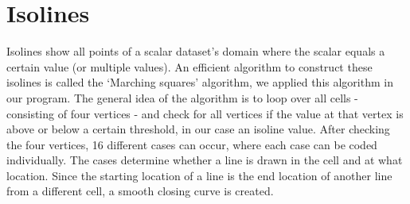 \section{Isolines}
Isolines show all points of a scalar dataset's domain where the scalar equals a certain value (or multiple values).
An efficient algorithm to construct these isolines is called the `Marching squares' algorithm, we applied this algorithm in our program.
The general idea of the algorithm is to loop over all cells - consisting of four vertices - and check for all vertices if the value at that vertex is above or below a certain threshold, in our case an isoline value.
After checking the four vertices, 16 different cases can occur, where each case can be coded individually.
The cases determine whether a line is drawn in the cell and at what location. 
Since the starting location of a line is the end location of another line from a different cell, a smooth closing curve is created.